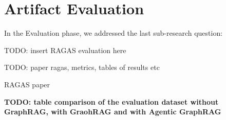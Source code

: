 \chapter{Artifact Evaluation}\label{chap:evaluation}

In the Evaluation phase, we addressed the last sub-research question:
\begin{center}
    \rqFour
\end{center}

TODO: insert RAGAS evaluation here

TODO: paper ragas, metrics, tables of results etc

RAGAS paper \cite{ragas2024}


\textbf{TODO: table comparison of the evaluation dataset without GraphRAG, with GraohRAG and with Agentic GraphRAG}